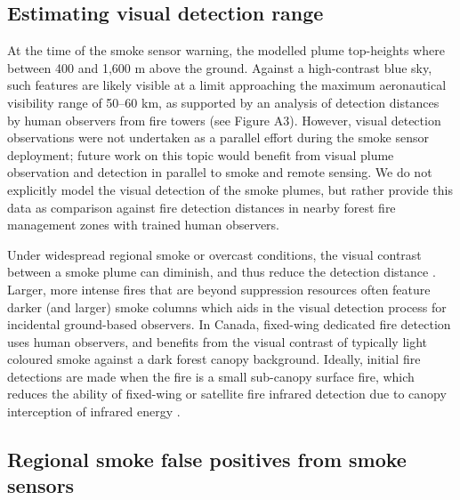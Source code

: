 \documentclass[fire,article,submit,moreauthors]{mdpi}
\begin{document}
\subsection{Estimating visual detection
range}\label{estimating-visual-detection-range}

At the time of the smoke sensor warning, the modelled plume top-heights
where between 400 and 1,600 m above the ground. Against a high-contrast
blue sky, such features are likely visible at a limit approaching the
maximum aeronautical visibility range of 50--60 km, as supported by an
analysis of detection distances by human observers from fire towers (see
Figure A3). However, visual detection observations were not undertaken
as a parallel effort during the smoke sensor deployment; future work on
this topic would benefit from visual plume observation and detection in
parallel to smoke and remote sensing. We do not explicitly model the
visual detection of the smoke plumes, but rather provide this data as
comparison against fire detection distances in nearby forest fire
management zones with trained human observers.

Under widespread regional smoke or overcast conditions, the visual
contrast between a smoke plume can diminish, and thus reduce the
detection distance \citep{victorSimpleMethodPredicting1977}. Larger,
more intense fires that are beyond suppression resources often feature
darker (and larger) smoke columns
\citep{stackInfluenceAirborneOcularly2024} which aids in the visual
detection process for incidental ground-based observers. In Canada,
fixed-wing dedicated fire detection
\citep{foster1962, mcfaydenRiskAssessmentWildland2019} uses human
observers, and benefits from the visual contrast of typically light
coloured smoke against a dark forest canopy background. Ideally, initial
fire detections are made when the fire is a small sub-canopy surface
fire, which reduces the ability of fixed-wing or satellite fire infrared
detection due to canopy interception of infrared energy
\citep{johnston2018}.

\subsection{Regional smoke false positives from smoke
sensors}\label{regional-smoke-false-positives-from-smoke-sensors}
\end{document}
